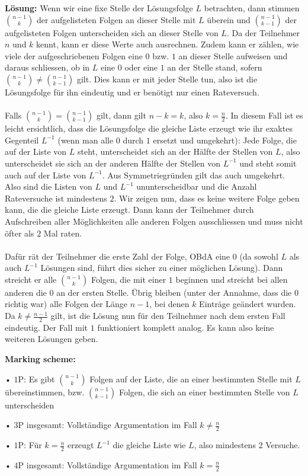\documentclass[language=german,style=solution]{smo}
\begin{document}
\begin{enumerate}
\textbf{Lösung:} Wenn wir eine fixe Stelle der Lösungsfolge $L$ betrachten, dann stimmen $\binom{n-1}{k}$ der aufgelisteten Folgen an dieser Stelle mit $L$ überein und $\binom{n-1}{k-1}$ der aufgelisteten Folgen unterscheiden sich an dieser Stelle von $L$. Da der Teilnehmer $n$ und $k$ kennt, kann er diese Werte auch ausrechnen. Zudem kann er zählen, wie viele der aufgeschriebenen Folgen eine $0$ bzw. $1$ an dieser Stelle aufweisen und daraus schliessen, ob in $L$ eine $0$ oder eine $1$ an der Stelle stand, sofern $\binom{n-1}{k} \neq \binom{n-1}{k-1}$ gilt. Dies kann er mit jeder Stelle tun, also ist die Lösungsfolge für ihn eindeutig und er benötigt nur einen Rateversuch. \\ \\ Falls $\binom{n-1}{k} = \binom{n-1}{k-1}$ gilt, dann gilt $n-k = k$, also $k = \frac{n}{2}$. In diesem Fall ist es leicht ersichtlich, dass die Lösungsfolge die gleiche Liste erzeugt wie ihr exaktes Gegenteil $L^{-1}$ (wenn man alle $0$ durch $1$ ersetzt und umgekehrt): Jede Folge, die auf der Liste von $L$ steht, unterscheidet sich an der Hälfte der Stellen von $L$, also unterscheidet sie sich an der anderen Hälfte der Stellen von $L^{-1}$ und steht somit auch auf der Liste von $L^{-1}$. Aus Symmetriegründen gilt das auch umgekehrt. Also sind die Listen von $L$ und $L^{-1}$ ununterscheidbar und die Anzahl Rateversuche ist mindestens $2$. Wir zeigen nun, dass es keine weitere Folge geben kann, die die gleiche Liste erzeugt. Dann kann der Teilnehmer durch Aufschreiben aller Möglichkeiten alle anderen Folgen ausschliessen und muss nicht öfter als $2$ Mal raten. \\
\\
Dafür rät der Teilnehmer die erste Zahl der Folge, OBdA eine $0$ (da sowohl $L$ als auch $L^{-1}$ Lösungen sind, führt dies sicher zu einer möglichen Lösung).
Dann streicht er alle $\binom{n-1}{k}$ Folgen, die mit einer $1$ beginnen und streicht bei allen anderen die $0$ an der ersten Stelle. Übrig bleiben (unter der Annahme, dass die $0$ richtig war) alle Folgen der Länge $n-1$, bei denen $k$ Einträge geändert wurden. Da $k \neq \frac{n-1}{2}$ gilt, ist die Lösung nun für den Teilnehmer nach dem ersten Fall eindeutig. Der Fall mit $1$ funktioniert komplett analog. Es kann also keine weiteren Lösungen geben.


\textbf{Marking scheme:}

\begin{list}{}{}
\item[•] $1$P: Es gibt $\binom{n-1}{k}$ Folgen auf der Liste, die an einer bestimmten Stelle mit $L$ übereinstimmen, bzw. $\binom{n-1}{k-1}$ Folgen, die sich an einer bestimmten Stelle von $L$ unterscheiden 
\item[•] $3$P insgesamt: Vollständige Argumentation im Fall $k \neq \frac{n}{2}$
\item[•] $1$P: Für $k=\frac{n}{2}$ erzeugt $L^{-1}$ die gleiche Liste wie $L$, also mindestens $2$ Versuche.
\item[•] $4$P insgesamt: Vollständige Argumentation im Fall $k=\frac{n}{2}$
\end{list}


\end{enumerate}
\end{document}
